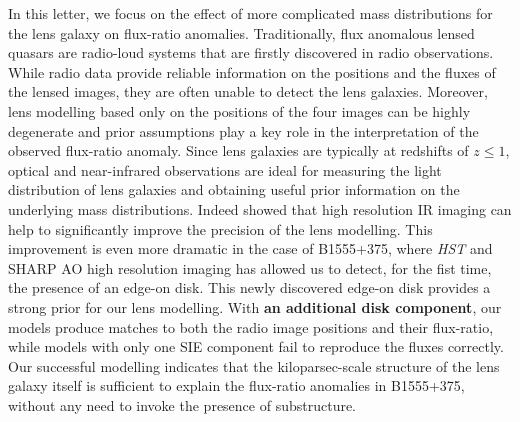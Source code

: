 \documentclass[useAMS,usenatbib]{mn2e}
\begin{document}
In this letter, we focus on the effect of more complicated mass
distributions for the lens galaxy on flux-ratio anomalies.
Traditionally, flux anomalous lensed quasars are radio-loud systems
that are firstly discovered in radio observations. While radio data
provide reliable information on the positions and the fluxes of the
lensed images, they are often unable to detect the lens
galaxies. Moreover, lens modelling based only on the positions of the
four images can be highly degenerate and prior assumptions play a key
role in the interpretation of the observed flux-ratio anomaly.  Since
lens galaxies are typically at redshifts of $z \leq 1$, optical and
near-infrared observations are ideal for measuring the light distribution
of lens galaxies and obtaining useful prior information on the underlying
mass distributions. Indeed \citet{SHARP12} showed that high
resolution IR imaging can help to significantly improve the precision
of the lens modelling. This improvement is even more dramatic in the
case of B1555+375, where \textit{HST} and SHARP AO high resolution imaging has
allowed us to detect, for the fist time, the presence of an edge-on
disk. This newly discovered edge-on disk provides a strong prior for our
lens modelling.  With \textbf{an additional disk component}, our models produce
matches to both the radio image positions and their flux-ratio, while
models with only one SIE component \citep{Marlow99,Xu14} fail to
reproduce the fluxes correctly. Our successful modelling indicates
that the kiloparsec-scale structure of the lens galaxy itself is
sufficient to explain the flux-ratio anomalies in B1555+375, without
any need to invoke the presence of substructure.
\end{document}
